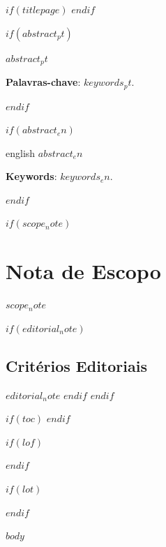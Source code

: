 \documentclass[$for(classoption)$$classoption$$sep$,$endfor$]{$documentclass$}
\begin{document}
\frenchspacing

\pretextual
$if(titlepage)$
\imprimircapa
\imprimirfolhaderosto*
$endif$

$if(abstract_pt)$
\begin{resumo}
$abstract_pt$

\vspace{\onelineskip}
\noindent
\textbf{Palavras-chave}: $keywords_pt$.
\end{resumo}
$endif$

$if(abstract_en)$
\begin{resumo}[Abstract]
\begin{otherlanguage*}{english}
$abstract_en$

\vspace{\onelineskip}
\noindent
\textbf{Keywords}: $keywords_en$.
\end{otherlanguage*}
\end{resumo}
$endif$

$if(scope_note)$
\chapter*{Nota de Escopo}
$scope_note$

$if(editorial_note)$
\section*{Critérios Editoriais}
$editorial_note$
$endif$
$endif$

$if(toc)$
\tableofcontents*
\clearpage
$endif$

$if(lof)$
\listoffigures*
\clearpage
$endif$

$if(lot)$
\listoftables*
\clearpage
$endif$

\textual
$body$
\end{document}
